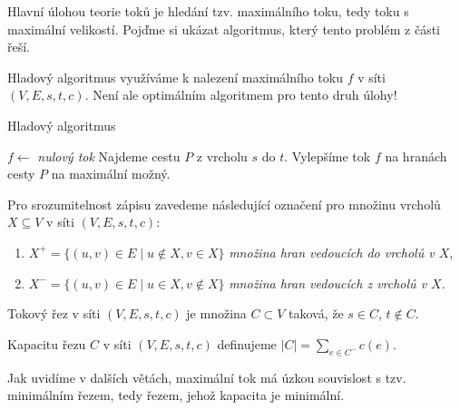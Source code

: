 \begin{t_remark}
  Hlavní úlohou teorie toků je hledání tzv. maximálního toku, tedy toku s maximální velikostí. Pojďme si ukázat algoritmus, který tento problém z části řeší.
\end{t_remark}

\begin{t_definition}
  Hladový algoritmus využíváme k nalezení maximálního toku $f$ v síti $(V, E, s, t, c)$. Není ale optimálním algoritmem pro tento druh úlohy!
  
  \begin{algorithm}
    \caption{Hladový algoritmus}
    \begin{algorithmic}[1]
      \State $f\gets$ \textit{nulový tok}
      \Repeat
      \State Najdeme cestu $P$ z vrcholu $s$ do $t$.
      \State Vylepšíme tok $f$ na hranách cesty $P$ na maximální možný.
    \end{algorithmic}
  \end{algorithm}
\end{t_definition}

\begin{t_definition}
  Pro srozumitelnost zápisu zavedeme následující označení pro množinu vrcholů $X\subseteq V$ v síti $(V, E, s, t, c)$:
  \begin{enumerate}
    \item $X^+=\{(u,v)\in E\mid u\notin X, v\in X\}$ \textit{množina hran vedoucích do vrcholů v $X$},
    \item $X^-=\{(u,v)\in E\mid u\in X, v\notin X\}$ \textit{množina hran vedoucích z vrcholů v $X$}.
  \end{enumerate}
\end{t_definition}

\begin{t_definition}
  Tokový řez v síti $(V, E, s, t, c)$ je množina $C\subset V$ taková, že $s\in C$, $t\notin C$.
\end{t_definition}

\begin{t_definition}
  Kapacitu řezu $C$ v síti $(V, E, s, t, c)$ definujeme $|C|=\sum_{e\in C^-} c(e)$.
\end{t_definition}

\begin{t_remark}
  Jak uvidíme v dalších větách, maximální tok má úzkou souvislost s tzv. minimálním řezem, tedy řezem, jehož kapacita je minimální.
\end{t_remark}

